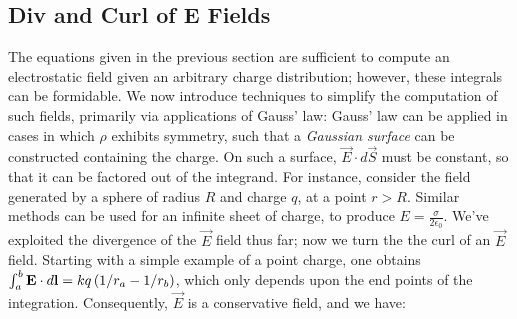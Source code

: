 \subsection{Div and Curl of E Fields}
The equations given in the previous section are sufficient to compute an electrostatic field given an arbitrary charge distribution; however, these integrals can be formidable. We now introduce techniques to simplify the computation of such fields, primarily via applications of Gauss' law:
Gauss' law can be applied in cases in which $\rho$ exhibits symmetry, such that a \textit{Gaussian surface} can be constructed containing the charge. On such a surface, $\vec{E}\cdot d\vec{S}$ must be constant, so that it can be factored out of the integrand. For instance, consider the field generated by a sphere of radius $R$ and charge $q$, at a point $r>R$.
Similar methods can be used for an infinite sheet of charge, to produce $E=\frac{\sigma}{2\epsilon_0}$. We've exploited the divergence of the $\vec{E}$ field thus far; now we turn the the curl of an $\vec{E}$ field. Starting with a simple example of a point charge, one obtains $\int_a^b \boldsymbol{\mathbf{E}} \cdot d\boldsymbol{\mathbf{l}} = kq \left(1/r_a - 1/r_b\right)$, which only depends upon the end points of the integration. Consequently, $\vec{E}$ is a conservative field, and we have:
